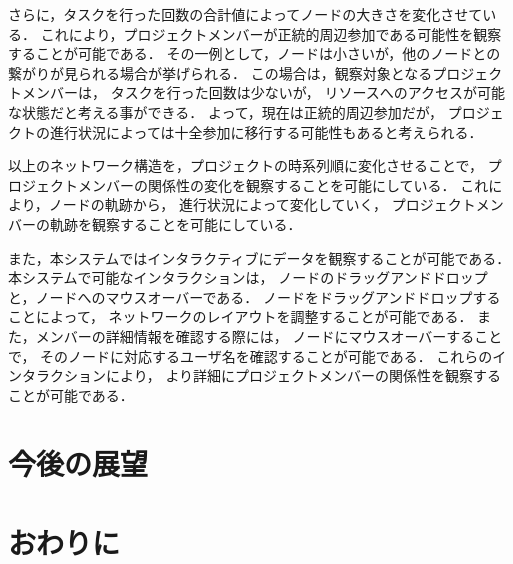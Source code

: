 \documentclass[submit,techrep]{ipsj}
\begin{document}
さらに，タスクを行った回数の合計値によってノードの大きさを変化させている．
これにより，プロジェクトメンバーが正統的周辺参加である可能性を観察することが可能である．
その一例として，ノードは小さいが，他のノードとの繋がりが見られる場合が挙げられる．
この場合は，観察対象となるプロジェクトメンバーは，
タスクを行った回数は少ないが，
リソースへのアクセスが可能な状態だと考える事ができる．
よって，現在は正統的周辺参加だが，
プロジェクトの進行状況によっては十全参加に移行する可能性もあると考えられる．

以上のネットワーク構造を，プロジェクトの時系列順に変化させることで，
プロジェクトメンバーの関係性の変化を観察することを可能にしている．
これにより，ノードの軌跡から，
進行状況によって変化していく，
プロジェクトメンバーの軌跡を観察することを可能にしている．

また，本システムではインタラクティブにデータを観察することが可能である．
本システムで可能なインタラクションは，
ノードのドラッグアンドドロップと，ノードへのマウスオーバーである．
ノードをドラッグアンドドロップすることによって，
ネットワークのレイアウトを調整することが可能である．
また，メンバーの詳細情報を確認する際には，
ノードにマウスオーバーすることで，
そのノードに対応するユーザ名を確認することが可能である．
これらのインタラクションにより，
より詳細にプロジェクトメンバーの関係性を観察することが可能である．


%

\section{今後の展望}

\section{おわりに}
\end{document}
